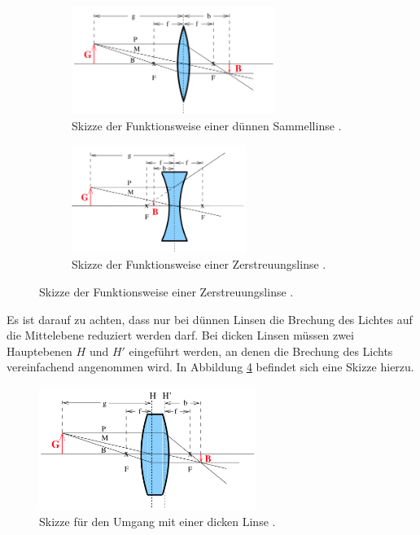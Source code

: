 \begin{figure}
  \centering
  \begin{subfigure}{0.48\textwidth}
    \includegraphics[height=3.5cm]{data/bikonvex.png}
    \caption{Skizze der Funktionsweise einer dünnen Sammellinse \cite{Versuchsanleitung}.}
    \label{fig:bikonvex}
  \end{subfigure}
  \begin{subfigure}{0.48\textwidth}
    \centering
    \includegraphics[height=3.5cm]{data/bikonkav.png}
    \caption{Skizze der Funktionsweise einer Zerstreuungslinse \cite{Versuchsanleitung}.}
    \label{fig:bikonkav}
  \end{subfigure}
\end{figure}

Es ist darauf zu achten, dass nur bei dünnen Linsen die Brechung des Lichtes auf die Mittelebene
reduziert werden darf. Bei dicken Linsen müssen zwei Hauptebenen $H$ und $H'$ eingeführt werden,
an denen die Brechung des Lichts vereinfachend angenommen wird. In Abbildung \ref{fig:dick}
befindet sich eine Skizze hierzu.

\begin{figure}
  \centering
  \includegraphics[height=4cm]{data/dick.png}
  \caption{Skizze für den Umgang mit einer dicken Linse \cite{Versuchsanleitung}.}
  \label{fig:dick}
\end{figure}

